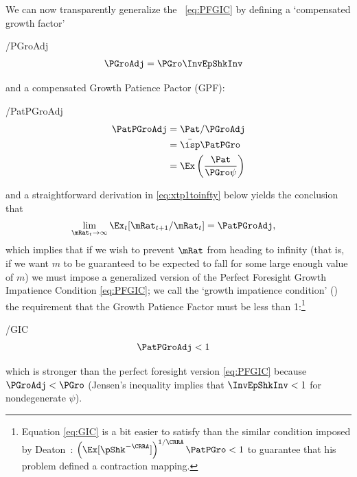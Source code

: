 \documentclass[BufferStockTheory]{subfiles}
\begin{document}
\hypertarget{GIC}{}
\hypertarget{GICI}{}
We can now transparently generalize the \PFGIC~\eqref{eq:PFGIC} by defining a `compensated growth factor' \hypertarget{PGroAdj}{}
\begin{verbatimwrite}{\EqDir/PGroAdj}
  \begin{align}
    \PGroAdj  & =  \PGro \InvEpShkInv \label{eq:PGroAdj}
  \end{align}
\end{verbatimwrite}

and a compensated Growth Patience Pactor (GPF):\hypertarget{GIF}{}
\begin{verbatimwrite}{\EqDir/PatPGroAdj}
  \begin{align}
    \PatPGroAdj  & = \Pat/\PGroAdj \label{eq;GPF}
    \\ & = \bar{\isp}\PatPGro  \notag %
    \\ & = \Ex\left(\frac{\Pat}{\PGro \psi}\right) \notag
  \end{align}
\end{verbatimwrite}

and a straightforward derivation in \eqref{eq:xtp1toinfty} below yields the conclusion that
\begin{align*}
  \lim_{\mRat_{t} \rightarrow \infty} \Ex_{t}[\mRat_{t+1}/\mRat_{t}]  & = \PatPGroAdj,
\end{align*}
which implies that if we wish to prevent $\mRat$ from heading to infinity (that is, if we want $m$ to be guaranteed to be expected to fall for some large enough value of $m$) we must impose a generalized version of the Perfect Foresight Growth Impatience Condition \eqref{eq:PFGIC}; we call the `growth impatience condition' (\GIC) the requirement that the Growth Patience Factor must be less than 1:\footnote{Equation \eqref{eq:GIC} is a bit easier to satisfy than the similar condition imposed by Deaton~\citeyearpar{deatonLiqConstr}: $\left(\Ex[\pShk^{-\CRRA}]\right)^{1/\CRRA} \PatPGro < 1$ to guarantee that his problem defined a contraction mapping.}  
\begin{verbatimwrite}{\EqDir/GIC}
  \begin{align}
    \PatPGroAdj  & < 1 \label{eq:GIC}
  \end{align}\end{verbatimwrite}

which is stronger than the perfect foresight version \eqref{eq:PFGIC} because $\PGroAdj < \PGro$ (Jensen's inequality implies that $\InvEpShkInv < 1$ for nondegenerate $\psi$).

\hypertarget{Autarky-Value}{}
\end{document}
